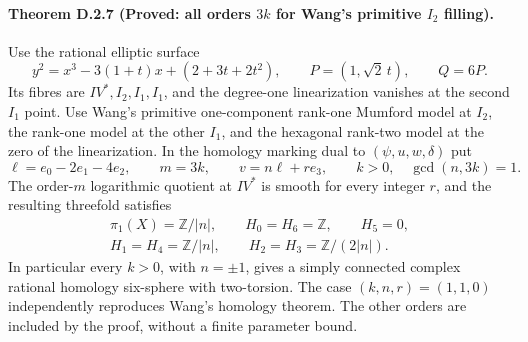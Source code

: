 \paragraph{Theorem D.2.7 (Proved: all orders $3k$ for Wang's primitive $I_2$ filling).}
Use the rational elliptic surface
\[
 y^2=x^3-3(1+t)x+(2+3t+2t^2),
 \qquad P=(1,\sqrt2\,t),\qquad Q=6P.
\]
Its fibres are $IV^*,I_2,I_1,I_1$, and the degree-one
linearization vanishes at the second $I_1$ point. Use Wang's
primitive one-component rank-one Mumford model at $I_2$, the
rank-one model at the other $I_1$, and the hexagonal rank-two
model at the zero of the linearization. In the homology marking
dual to $(\psi,u,w,\delta)$ put
\[
 \ell=e_0-2e_1-4e_2,\qquad
 m=3k,\qquad v=n\ell+r e_3,
 \qquad k>0,\quad \gcd(n,3k)=1.
\]
The order-$m$ logarithmic quotient at $IV^*$ is smooth for every
integer $r$, and the resulting threefold satisfies
\[
 \begin{gathered}
 \pi_1(X)=\mathbb Z/|n|,\qquad H_0=H_6=\mathbb Z,
 \qquad H_5=0,\\
 H_1=H_4=\mathbb Z/|n|,\qquad
 H_2=H_3=\mathbb Z/(2|n|).
 \end{gathered}
\]
In particular every $k>0$, with $n=\pm1$, gives a simply
connected complex rational homology six-sphere with two-torsion.
The case $(k,n,r)=(1,1,0)$ independently reproduces Wang's
homology theorem. The other orders are included by the proof,
without a finite parameter bound.
